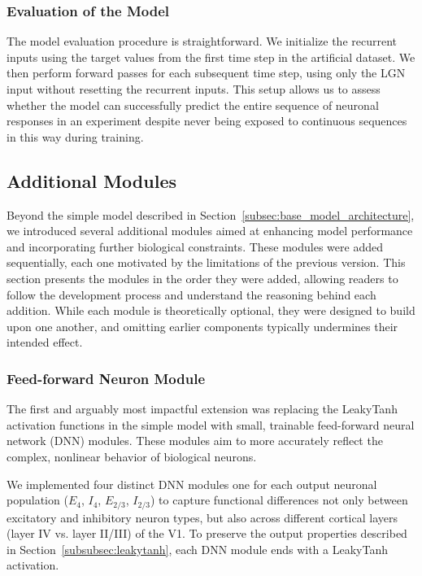\subsubsection{Evaluation of the Model}
\label{subsubsec:evaluation_model}

The model evaluation procedure is straightforward. We initialize the recurrent inputs using the target values from the first time step in the artificial dataset. We then perform forward passes for each subsequent time step, using only the LGN input without resetting the recurrent inputs. This setup allows us to assess whether the model can successfully predict the entire sequence of neuronal responses in an experiment despite never being exposed to continuous sequences in this way during training.

\subsection{Additional Modules}
\label{subsec:additional_modules}

Beyond the simple model described in Section~\ref{subsec:base_model_architecture}, we introduced several additional modules aimed at enhancing model performance and incorporating further biological constraints. These modules were added sequentially, each one motivated by the limitations of the previous version. This section presents the modules in the order they were added, allowing readers to follow the development process and understand the reasoning behind each addition. While each module is theoretically optional, they were designed to build upon one another, and omitting earlier components typically undermines their intended effect.

\subsubsection{Feed-forward Neuron Module}
\label{subsubsec:dnn_neuron}

The first and arguably most impactful extension was replacing the LeakyTanh activation functions in the simple model with small, trainable feed-forward neural network (DNN) modules. These modules aim to more accurately reflect the complex, nonlinear behavior of biological neurons.

We implemented four distinct DNN modules one for each output neuronal population ($E_4$, $I_4$, $E_{2/3}$, $I_{2/3}$) to capture functional differences not only between excitatory and inhibitory neuron types, but also across different cortical layers (layer IV vs. layer II/III) of the V1. To preserve the output properties described in Section~\ref{subsubsec:leakytanh}, each DNN module ends with a LeakyTanh activation.

